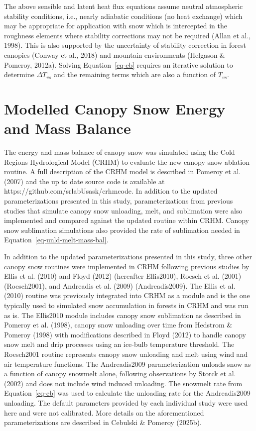 \documentclass[
  letterpaper,
  DIV=11,
  numbers=noendperiod]{scrartcl}
\begin{document}
The above sensible and latent heat flux equations assume neutral
atmospheric stability conditions, i.e., nearly adiabatic conditions (no
heat exchange) which may be appropriate for application with snow which
is intercepted in the roughness elements where stability corrections may
not be required (Allan et al., 1998). This is also supported by the
uncertainty of stability correction in forest canopies (Conway et al.,
2018) and mountain environments (Helgason \& Pomeroy, 2012a). Solving
Equation~\ref{eq-eb} requires an iterative solution to determine
\(\Delta T_{vs}\) and the remaining terms which are also a function of
\(T_{vs}\).

\section{Modelled Canopy Snow Energy and Mass
Balance}\label{modelled-canopy-snow-energy-and-mass-balance}

The energy and mass balance of canopy snow was simulated using the Cold
Regions Hydrological Model (CRHM) to evaluate the new canopy snow
ablation routine. A full description of the CRHM model is described in
Pomeroy et al. (2007) and the up to date source code is available at
https://github.com/srlabUsask/crhmcode. In addition to the updated
parameterizations presented in this study, parameterizations from
previous studies that simulate canopy snow unloading, melt, and
sublimation were also implemented and compared against the updated
routine within CRHM. Canopy snow sublimation simulations also provided
the rate of sublimation needed in Equation~\ref{eq-unld-melt-mass-bal}.

In addition to the updated parameterizations presented in this study,
three other canopy snow routines were implemented in CRHM following
previous studies by Ellis et al. (2010) and Floyd (2012) (hereafter
Ellis2010), Roesch et al. (2001) (Roesch2001), and Andreadis et al.
(2009) (Andreadis2009). The Ellis et al. (2010) routine was previously
integrated into CRHM as a module and is the one typically used to
simulated snow accumulation in forests in CRHM and was run as is. The
Ellis2010 module includes canopy snow sublimation as described in
Pomeroy et al. (1998), canopy snow unloading over time from Hedstrom \&
Pomeroy (1998) with modifications described in Floyd (2012) to handle
canopy snow melt and drip processes using an ice-bulb temperature
threshold. The Roesch2001 routine represents canopy snow unloading and
melt using wind and air temperature functions. The Andreadis2009
parameterization unloads snow as a function of canopy snowmelt alone,
following observations by Storck et al. (2002) and does not include wind
induced unloading. The snowmelt rate from Equation~\ref{eq-eb} was used
to calculate the unloading rate for the Andreadis2009 unloading. The
default parameters provided by each individual study were used here and
were not calibrated. More details on the aforementioned
parameterizations are described in Cebulski \& Pomeroy (2025b).
\end{document}
